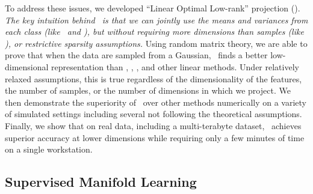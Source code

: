 \documentclass[11pt]{extarticle}
\begin{document}
To address these issues,  we developed ``Linear Optimal Low-rank'' projection (\Lol).
\emph{The key intuition behind \Lol~is that we can jointly use the means and variances from each class  (like \Lda~and \Cca), but without requiring more dimensions than samples   (like \Pca), or restrictive sparsity assumptions.}
Using random matrix theory, we are able to prove that when the data are sampled from a  Gaussian, \Lol~finds a better low-dimensional representation than \Pca, \Lda, \Cca, and  other  linear methods. Under  relatively relaxed assumptions, this is true regardless of the dimensionality of the features, the number of samples, or the number of dimensions in which we project.
We then demonstrate the superiority of \Lol~over other methods numerically on a variety of simulated settings including several  not following the theoretical assumptions. Finally, we show that on real data, including a multi-terabyte dataset, \Lol~achieves superior accuracy at lower dimensions while requiring only a few minutes of time on a single workstation.




\subsection*{Supervised Manifold Learning}
\end{document}
